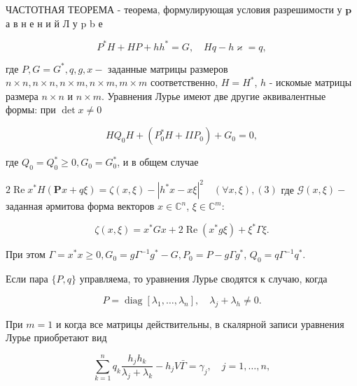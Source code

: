\documentclass[10pt]{article}
\begin{document}
ЧАСТОТНАЯ ТЕОРЕМА - теорема, формулирующая условия разрешимости у $\mathbf{p}$ а в н е н и й $Л$ у $\mathrm{p}$ b е



\[

P^{*} H+H P+h h^{*}=G, \quad H q-h \varkappa=q,

\]



где $P, G=G^{*}, q, g, x-$ заданные матрицы размеров $n \times n, n \times n, n \times m, n \times m, m \times m$ соответственно, $H=H^{*}$, $h$ - искомые матрицы размера $n \times n$ и $n \times m$. Уравнения Лурье имеют две другие әквивалентные формы: при $\operatorname{det} x \neq 0$



\[

H Q_{0} H+\left(P_{0}^{*} H+I I P_{0}\right)+G_{0}=0,

\]



где $Q_{0}=Q_{0}^{*} \geqslant 0, G_{0}=G_{0}^{*}$, и в общем случае



$2 \operatorname{Re} x^{*} H(\boldsymbol{P} x+q \xi)=\zeta(x, \xi)-\left|h^{*} x-x \xi\right|^{2} \quad(\forall x, \xi),(3)$ где $\mathscr{G}(x, \xi)-$ заданная әрмитова форма векторов $x \in \mathbb{C}^{n}$, $\xi \in \mathbb{C}^{m}:$



\[

\zeta(x, \xi)=x^{*} G x+2 \operatorname{Re}\left(x^{*} g \xi\right)+\xi^{*} \Gamma \xi .

\]



При этом $\Gamma=x^{*} x \geqslant 0, G_{0}=g \Gamma^{-1} g^{*}-G, P_{0}=P-g \Gamma g^{*}$, $Q_{0}=q \Gamma^{-1} q^{*}$.



Если пара $\{P, q\}$ управляема, то уравнения Лурье сводятся к случаю, когда



\[

P=\operatorname{diag}\left[\lambda_{1}, \ldots, \lambda_{n}\right], \quad \lambda_{j}+\lambda_{h} \neq 0 .

\]



При $m=1$ и когда все матрицы действительны, в скалярной записи уравнения Лурье приобретают вид



\[

\sum_{k=1}^{n} q_{k} \frac{h_{j} h_{k}}{\lambda_{j}+\lambda_{k}}-h_{j} V \bar{\Gamma}=\gamma_{j}, \quad j=1, \ldots, n,

\]
\end{document}
